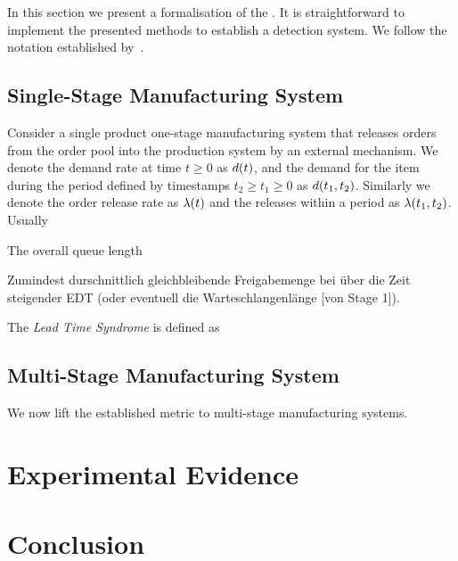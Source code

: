 \documentclass[dvips,mnsc]{informs3}
\begin{document}
In this section we present a formalisation of the \LTS{}. It is straightforward to implement the
presented methods to establish a \LTS{} detection system. We follow the notation established
by~\cite{selccuk2013adaptive}.

\subsection{Single-Stage Manufacturing System}
\label{subsec:Single-Stage_Manufacturing_System}


Consider a single product one-stage manufacturing system that releases orders from the order pool
into the production system by an external mechanism. We denote the demand rate at time
$t \geqslant 0$ as ${d}(t)$, and the demand for the item during the period defined by timestamps
$t_{2} \geqslant t_{1} \geqslant 0$ as ${d}(t_{1},t_{2})$. Similarly we denote the order release
rate as ${\lambda}(t)$ and the releases within a period as ${\lambda}(t_{1},t_{2})$. Usually

\begin{definition}

  The overall queue length

\end{definition}


Zumindest durschnittlich gleichbleibende Freigabemenge bei über die Zeit steigender EDT (oder
eventuell die Warteschlangenlänge [von Stage 1]).


\begin{definition}
  The \emph{Lead Time Syndrome} is defined as
\end{definition}



\subsection{Multi-Stage Manufacturing System}
\label{subsec:Multi-Stage_Manufacturing_System}


We now lift the established metric to multi-stage manufacturing systems.


\section{Experimental Evidence}
\label{sec:Experimental_Evidence}


\section{Conclusion}
\label{sec:Conclusion}




\end{document}
